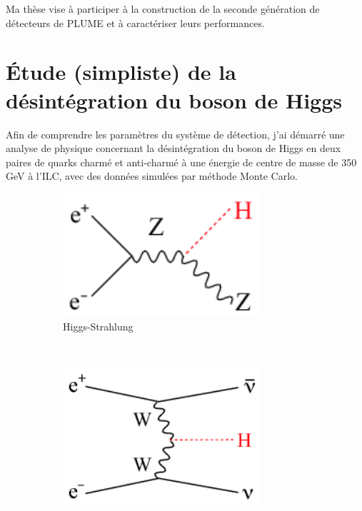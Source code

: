 \documentclass[a4papper, 10pt]{article}
\begin{document}
  Ma thèse vise à participer à la construction de la seconde génération de détecteurs de PLUME et à caractériser leurs performances.

  \section{Étude (simpliste) de la désintégration du boson de Higgs}

  Afin de comprendre les paramètres du système de détection, j'ai démarré une analyse de physique concernant la désintégration du boson de Higgs en deux paires de quarks charmé et anti-charmé à une énergie de centre de masse de 350 GeV à l'ILC, avec des données simulées par méthode Monte Carlo.

    \begin{figure}  
        \centering
        \begin{subfigure}[t]{0.3\textwidth}
            \includegraphics[width = 0.8\textwidth]{Pictures/Chapter_Theory_figs_ZHdiagram.png}
            \caption{Higgs-Strahlung}
            \label{fig:higgsStrahlung}
        \end{subfigure}
        ~%
        \begin{subfigure}[t]{0.3\textwidth}
            \includegraphics[width = 0.8\textwidth]{Pictures/Chapter_Theory_figs_nunuHdiagram.png}

\end{subfigure}
\end{figure}
\end{document}
